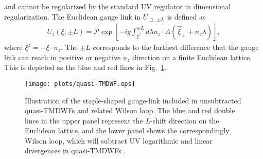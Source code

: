 \documentclass[prd,aps,twocolumn,preprintnumbers, showpacs, nofootinbib,superscriptaddress,notitlepage]{revtex4-1}
\newcommand\bl{\color{blue}}
\begin{document}
and cannot be regularized by the standard UV regulator in dimensional regularization. The Euclidean gauge link in $U_{\sqsupset, \pm L}$ is defined as
\begin{align}
	U_z(\xi,\pm L)=\mathcal{P}	\exp \left[-i g \int_{\xi^{z}}^{\pm L} d \lambda n_{z} \cdot A\left(\vec{\xi}_{\perp}+n_{z} \lambda\right)\right],
\end{align}
where $\xi^{z}=-\xi \cdot n_{z}$. The $\pm L$  corresponds to the farthest difference that the gauge link can reach in positive or negative $n_z$  {\bl direction}  on a finite Euclidean lattice. This is depicted as the blue and red lines {\bl in} Fig.~\ref{fig:definitionofquasiTMDWF}.



\begin{figure}
\centering
\texttt{[image: plots/quasi-TMDWF.eps]}
\caption{Illustration of the staple-shaped gauge-link included in unsubtracted quasi-TMDWFs  and related Wilson loop. The blue and red double lines in the upper panel represent the $L$-shift direction on the Euclidean lattice, and the lower panel shows the correspondingly Wilson loop, which will subtract   UV logarithmic  and linear divergences in  quasi-TMDWFs . }
\label{fig:definitionofquasiTMDWF}
\end{figure}
\end{document}
